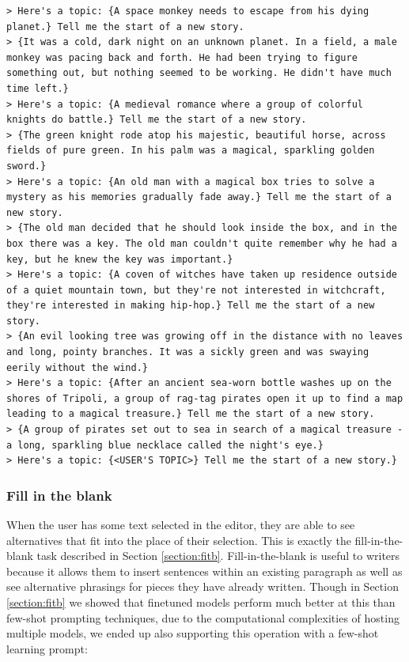 \begin{lstlisting}
> Here's a topic: {A space monkey needs to escape from his dying planet.} Tell me the start of a new story.
> {It was a cold, dark night on an unknown planet. In a field, a male monkey was pacing back and forth. He had been trying to figure something out, but nothing seemed to be working. He didn't have much time left.}
> Here's a topic: {A medieval romance where a group of colorful knights do battle.} Tell me the start of a new story.
> {The green knight rode atop his majestic, beautiful horse, across fields of pure green. In his palm was a magical, sparkling golden sword.}
> Here's a topic: {An old man with a magical box tries to solve a mystery as his memories gradually fade away.} Tell me the start of a new story.
> {The old man decided that he should look inside the box, and in the box there was a key. The old man couldn't quite remember why he had a key, but he knew the key was important.}
> Here's a topic: {A coven of witches have taken up residence outside of a quiet mountain town, but they're not interested in witchcraft, they're interested in making hip-hop.} Tell me the start of a new story.
> {An evil looking tree was growing off in the distance with no leaves and long, pointy branches. It was a sickly green and was swaying eerily without the wind.}
> Here's a topic: {After an ancient sea-worn bottle washes up on the shores of Tripoli, a group of rag-tag pirates open it up to find a map leading to a magical treasure.} Tell me the start of a new story.
> {A group of pirates set out to sea in search of a magical treasure - a long, sparkling blue necklace called the night's eye.}
> Here's a topic: {<USER'S TOPIC>} Tell me the start of a new story.}
\end{lstlisting}

\subsubsection{Fill in the blank}
When the user has some text selected in the editor, they are able to see alternatives that fit into the place of their selection.
This is exactly the fill-in-the-blank task described in Section \ref{section:fitb}.
Fill-in-the-blank is useful to writers because it allows them to insert sentences within an existing paragraph as well as see alternative phrasings for pieces they have already written.
Though in Section \ref{section:fitb} we showed that finetuned models perform much better at this than few-shot prompting techniques, due to the computational complexities of hosting multiple models, we ended up also supporting this operation with a few-shot learning prompt:

